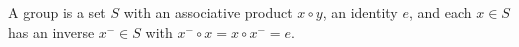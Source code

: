 A group is a set $S$ with an associative product $x \circ y$, an identity $e$, and each $x \in S$ has an inverse $x^{-} \in S$ with $x^{-} \circ x = x \circ x^{-} = e$.
